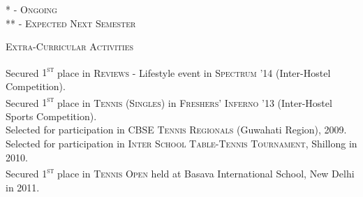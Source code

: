 \documentclass[10pt]{article}
\begin{document}
	\begin{flushright}
		\footnotesize\textsc{* - Ongoing}\\
		\footnotesize\textsc{** - Expected Next Semester}
	\end{flushright}	
	
	{\centering\Large{\textsc{Extra-Curricular Activities}}	 \hrulefill}
	
	\vspace{2mm}
	
	\begin{normalsize}
	Secured \textsc{1\textsuperscript{st}} place in \textsc{Reviews} - Lifestyle event in \textsc{Spectrum '14} (Inter-Hostel Competition).\\
	Secured \textsc{1\textsuperscript{st}} place in \textsc{Tennis (Singles)} in \textsc{Freshers' Inferno '13} (Inter-Hostel Sports Competition).\\	
	Selected for participation in \textsc{CBSE Tennis Regionals} (Guwahati Region), 2009.\\
	Selected for participation in \textsc{Inter School Table-Tennis Tournament}, Shillong in 2010.\\
	Secured \textsc{1\textsuperscript{st}} place in \textsc{Tennis Open} held at Basava International School, New Delhi in 2011.\\
	\end{normalsize}
\end{document}
